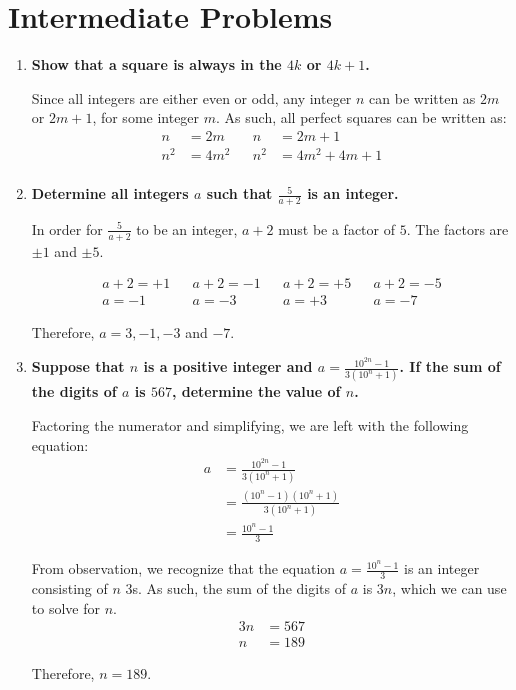 \documentclass[12pt]{article}
\begin{document}
\section*{Intermediate Problems}
\begin{enumerate}
    \item \textbf{Show that a square is always in the $4k$ or $4k + 1$.} 
    
    Since all integers are either even or odd, any integer $n$ can be written as $2m$ or $2m + 1$, for some integer $m$. As such, all perfect squares can be written as:
    \begin{align*}
        n &= 2m && n &= 2m + 1 \\
        n^2 &= 4m^2 && n^2 &= 4m^2 + 4m + 1 \\
    \end{align*}
    
    
    
    \item \textbf{Determine all integers $a$ such that $\displaystyle{\frac{5}{a + 2}}$ is an integer.} 
    
    In order for $\displaystyle{\frac{5}{a + 2}}$ to be an integer, $a + 2$ must be a factor of $5$. The factors are $\pm 1$ and $\pm 5$. \vspace{-0.5em}
    
    \begin{align*}
        a + 2 = +1 && a + 2 = -1 && a + 2 = +5 && a + 2 = -5 \\
        a = -1 && a = -3 && a = +3 && a = -7
    \end{align*}
    
    Therefore, $a = 3, -1, -3$ and $-7$.
    
    \item \textbf{Suppose that $n$ is a positive integer and $a = \displaystyle{\frac{10^{2n} - 1}{3(10^n + 1)}}$. If the sum of the digits of $a$ is $567$, determine the value of $n$.} 
    
    Factoring the numerator and simplifying, we are left with the following equation:
    \begin{align*}
        a &= \frac{10^{2n} - 1}{3(10^n + 1)} \\
        &= \frac{(10^n - 1)(10^n + 1)}{3(10^n + 1)} \\
        &= \frac{10^n - 1}{3}
    \end{align*}
    
    From observation, we recognize that the equation $\displaystyle{a = \frac{10^n - 1}{3}}$ is an integer consisting of $n$ $3$s. As such, the sum of the digits of $a$ is $3n$, which we can use to solve for $n$.
    \begin{align*}
        3n &= 567 \\
        n &= 189
    \end{align*}
    
    Therefore, $n = 189$.
\end{enumerate}
\end{document}
